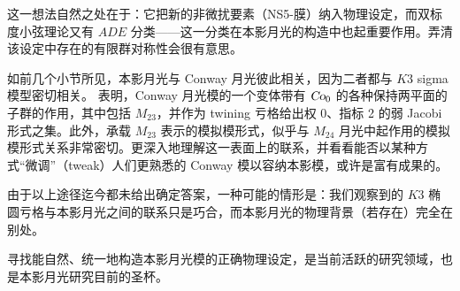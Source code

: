 这一想法自然之处在于：它把新的非微扰要素（NS5-膜）纳入物理设定，而双标度小弦理论又有 $ADE$ 分类——这一分类在本影月光的构造中也起重要作用。弄清该设定中存在的有限群对称性会很有意思。


 如前几个小节所见，本影月光与 Conway 月光彼此相关，因为二者都与 $K3$ sigma 模型密切相关。\cite{Cheng:2014owa} 表明，Conway 月光模的一个变体带有 $\operatorname{\textsl{Co}}_0$ 的各种保持两平面的子群的作用，其中包括 $M_{23}$，并作为 twining 亏格给出权 0、指标 2 的弱 Jacobi 形式之集。此外，承载 $M_{23}$ 表示的模拟模形式，似乎与 $M_{24}$ 月光中起作用的模拟模形式关系非常密切。更深入地理解这一表面上的联系，并看看能否以某种方式“微调”（tweak）人们更熟悉的 Conway 模以容纳本影模，或许是富有成果的。


 由于以上途径迄今都未给出确定答案，一种可能的情形是：我们观察到的 $K3$ 椭圆亏格与本影月光之间的联系只是巧合，而本影月光的物理背景（若存在）完全在别处。

寻找能自然、统一地构造本影月光模的正确物理设定，是当前活跃的研究领域，也是本影月光研究目前的圣杯。

